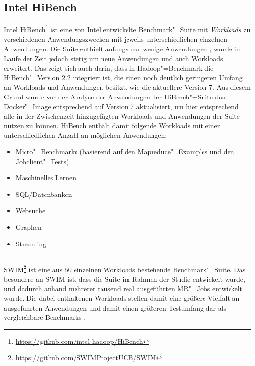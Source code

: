 \subsection{Intel HiBench}
\label{subsec:hibench}

Intel HiBench\footnote{\url{https://github.com/intel-hadoop/HiBench}} ist eine von Intel entwickelte Benchmark"=Suite mit \emph{Workloads} zu verschiedenen Anwendungszwecken mit jeweils unterschiedlichen einzelnen Anwendungen.
Die Suite enthielt anfangs nur wenige Anwendungen \cite{Huang2010}, wurde im Laufe der Zeit jedoch stetig um neue Anwendungen und auch Workloads erweitert.
Das zeigt sich auch darin, dass in Hadoop"=Benchmark die HiBench"=Version \mbox{2.2} integriert ist, die einen noch deutlich geringeren Umfang an Workloads und Anwendungen besitzt, wie \zB die aktuellere Version 7.
Aus diesem Grund wurde vor der Analyse der Anwendungen der HiBench"=Suite das Docker"=Image entsprechend auf Version 7 aktualisiert, um hier entsprechend alle in der Zwischenzeit hinzugefügten Workloads und Anwendungen der Suite nutzen zu können.
HiBench enthält damit folgende Workloads mit einer unterschiedlichen Anzahl an möglichen Anwendungen:

\begin{itemize}
    \item Micro"=Benchmarks (basierend auf den Mapreduce"=Examples und den Jobclient"=Tests)
    \item Maschinelles Lernen
    \item SQL/Datenbanken
    \item Websuche
    \item Graphen
    \item Streaming
\end{itemize}

\subsection{}
\label{subsec:swim}

\gls{SWIM}\footnote{\url{https://github.com/SWIMProjectUCB/SWIM}} ist eine aus 50 einzelnen Workloads bestehende Benchmark"=Suite.
Das besondere an \gls{SWIM} ist, dass die Suite im Rahmen der Studie \cite{Chen2012} entwickelt wurde, und dadurch anhand mehrerer tausend real ausgeführten \gls{MR}"=Jobs entwickelt wurde.
Die dabei enthaltenen Workloads stellen damit eine größere Vielfalt an ausgeführten Anwendungen und damit einen größeren Testumfang dar als vergleichbare Benchmarks \cite{SwimWikiHome}.

